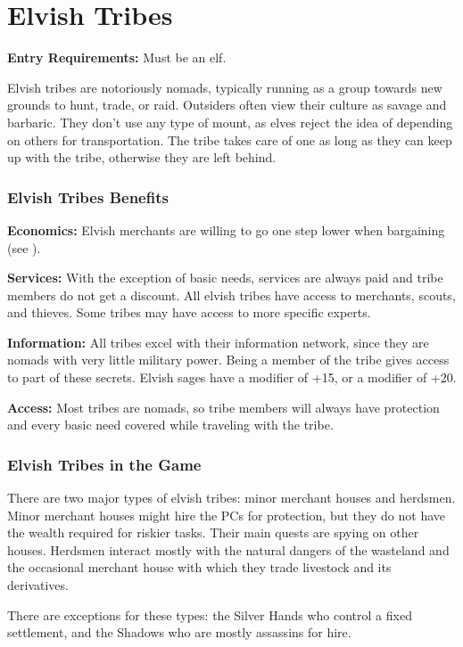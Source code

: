 \section{Elvish Tribes}

\textbf{Entry Requirements:} Must be an elf.

Elvish tribes are notoriously nomads, typically running as a group towards new grounds to hunt, trade, or raid. Outsiders often view their culture as savage and barbaric. They don't use any type of mount, as elves reject the idea of depending on others for transportation. The tribe takes care of one as long as they can keep up with the tribe, otherwise they are left behind.

\subsubsection{Elvish Tribes Benefits}
\textbf{Economics:} Elvish merchants are willing to go one step lower when bargaining (see ).

\textbf{Services:} With the exception of basic needs, services are always paid and tribe members do not get a discount. All elvish tribes have access to merchants, scouts, and thieves. Some tribes may have access to more specific experts.

\textbf{Information:} All tribes excel with their information network, since they are nomads with very little military power. Being a member of the tribe gives access to part of these secrets. Elvish sages have a  modifier of +15, or a  modifier of +20.

\textbf{Access:} Most tribes are nomads, so tribe members will always have protection and every basic need covered while traveling with the tribe.

\subsubsection{Elvish Tribes in the Game}
There are two major types of elvish tribes: minor merchant houses and herdsmen. Minor merchant houses might hire the PCs for protection, but they do not have the wealth required for riskier tasks. Their main quests are spying on other houses. Herdsmen interact mostly with the natural dangers of the wasteland and the occasional merchant house with which they trade livestock and its derivatives.

There are exceptions for these types: the Silver Hands who control a fixed settlement, and the Shadows who are mostly assassins for hire.

